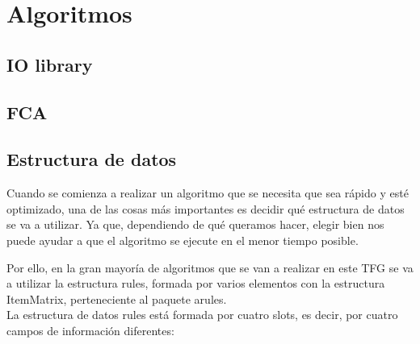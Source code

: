 \section{Algoritmos}
\subsection{IO library}



\subsection{FCA}





\subsection{Estructura de datos}

Cuando se comienza a realizar un algoritmo que se necesita que 
sea r\'apido y est\'e optimizado, una de las cosas m\'as importantes 
es decidir qu\'e estructura de datos se va a utilizar.
Ya que, dependiendo de qu\'e queramos hacer, elegir bien nos puede 
ayudar a que el algoritmo se ejecute en el menor tiempo posible.

Por ello, en la gran mayor\'ia de algoritmos que se van a realizar 
en este TFG se va a utilizar la estructura rules, formada por varios 
elementos con la estructura ItemMatrix, perteneciente al paquete 
arules.
\\

La estructura de datos rules est\'a formada por cuatro slots, es decir, por 
cuatro campos de informaci\'on diferentes:

